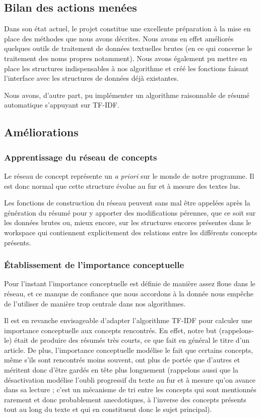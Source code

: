 \documentclass[a4paper, 12pt]{article}
\begin{document}
\subsection{Bilan des actions menées}

Dans son état actuel, le projet constitue une excellente préparation à la mise en place des méthodes que nous avons décrites. Nous avons en effet améliorés quelques outils de traitement de données textuelles brutes (en ce qui concerne le traitement des noms propres notamment). Nous avons également pu mettre en place les structures indispensables à nos algorithme et créé les fonctions faisant l'interface avec les structures de données déjà existantes.

Nous avons, d'autre part, pu implémenter un algorithme raisonnable de résumé automatique s'appuyant sur TF-IDF. %

\vspace{1\baselineskip}

\subsection{Améliorations}
\subsubsection{Apprentissage du réseau de concepts}
Le réseau de concept représente un \textit{a priori} sur le monde de notre programme. Il est donc normal que cette structure évolue au fur et à mesure des textes lus.

Les fonctions de construction du réseau peuvent sans mal être appelées après la génération du résumé pour y apporter des modifications pérennes, que ce soit sur les données brutes ou, mieux encore, sur les structures encores présentes dans le workspace qui contiennent explicitement des relations entre les différents concepts présents.

\subsubsection{Établissement de l'importance conceptuelle}

Pour l'instant l'importance conceptuelle est définie de manière assez floue dans le réseau, et ce manque de confiance que nous accordons à la donnée nous empêche de l'utiliser de manière trop centrale dans nos algorithmes.

Il est en revanche envisageable d'adapter l'algorithme TF-IDF pour calculer une importance conceptuelle aux concepts rencontrés. En effet, notre but (rappelons-le) était de produire des résumés très courts, ce que fait en général le titre d'un article. De plus, l'importance conceptuelle modélise le fait que certains concepts, même s'ils sont rencontrés moins souvent, ont plus de portée que d'autres et méritent donc d'être gardés en tête plus longuement (rappelons aussi que la désactivation modélise l'oubli progressif du texte au fur et à mesure qu'on avance dans sa lecture ; c'est un mécanisme de tri entre les concepts qui sont mentionnés rarement et donc probablement anecdotiques, à l'inverse des concepts présents tout au long du texte et qui en constituent donc le sujet principal).
\end{document}
